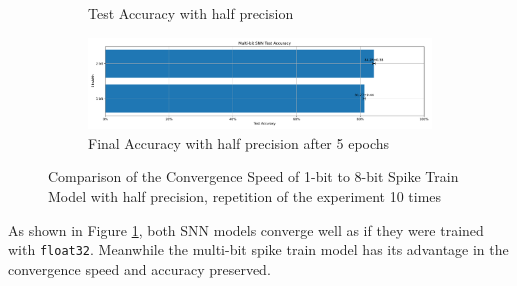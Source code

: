 \begin{figure}[!htpb]
\begin{subfigure}[H]{0.48\textwidth}
                \caption{Test Accuracy with half precision}
            \end{subfigure}
            \hfill
            \begin{subfigure}[H]{\textwidth}
                \centering
                \includegraphics[width=\textwidth]{../bf16/FashionMNIST/plots/fashionmnist_final_acc.pdf}
                \caption{Final Accuracy with half precision after 5 epochs}
            \end{subfigure}
            \caption{Comparison of the Convergence Speed of 1-bit to 8-bit Spike Train Model with half precision, repetition of the experiment 10 times}
            \label{fig:half_precision}
        \end{figure}

        As shown in Figure \ref{fig:half_precision}, both SNN models converge well as if they were trained with \verb|float32|. Meanwhile the multi-bit spike train model has its advantage in the convergence speed and accuracy preserved. 
       
